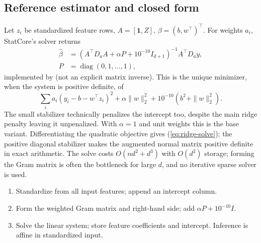 \documentclass[conference]{IEEEtran}
\begin{document}
\subsection{Reference estimator and closed form}
Let \(z_i\) be standardized feature rows, \(A=[\mathbf 1,Z]\), \(\beta=(b,w^\top)^\top\). For weights \(a_i\), StatCore's solver returns
\begin{equation}
\begin{split}
\hat\beta&=(A^\top D_a A+\alpha P+10^{-10}I_{d+1})^{-1}A^\top D_a y,\\
P&=\operatorname{diag}(0,1,\ldots,1),
\end{split}
\label{eq:ridge-solve}
\end{equation}
implemented by  (not an explicit matrix inverse). This is the unique minimizer, when the system is positive definite, of
\begin{equation}
\sum_i a_i(y_i-b-w^\top z_i)^2+\alpha\|w\|_2^2+10^{-10}(b^2+\|w\|_2^2).
\label{eq:ridge-obj}
\end{equation}
The small stabilizer technically penalizes the intercept too, despite the main ridge penalty leaving it unpenalized. With \(\alpha=1\) and unit weights this is the base variant. Differentiating the quadratic objective gives (\ref{eq:ridge-solve}); the positive diagonal stabilizer makes the augmented normal matrix positive definite in exact arithmetic. The solve costs \(O(nd^2+d^3)\) with \(O(d^2)\) storage; forming the Gram matrix is often the bottleneck for large \(d\), and no iterative sparse solver is used.
\begin{enumerate}
\item Standardize from all input features; append an intercept column.
\item Form the weighted Gram matrix and right-hand side; add \(\alpha P+10^{-10}I\).
\item Solve the linear system; store feature coefficients and intercept. Inference is affine in standardized input.
\end{enumerate}
\end{document}
